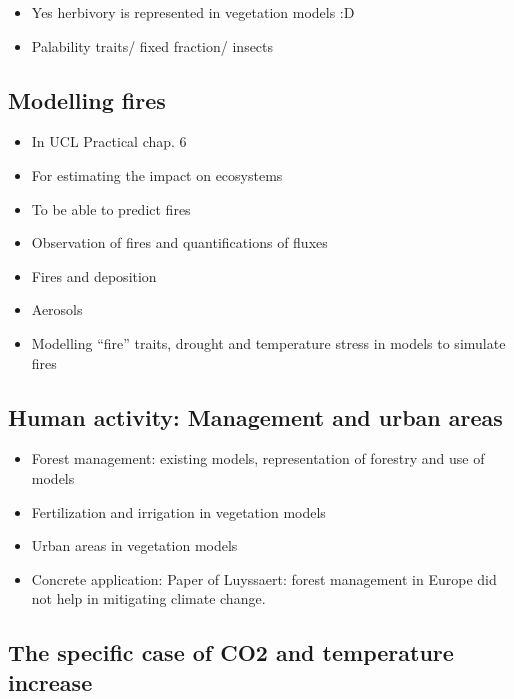 \documentclass[oneside]{book}
\providecommand{\tightlist}{%
  \setlength{\itemsep}{0pt}\setlength{\parskip}{0pt}}
\begin{document}
\begin{itemize}
\tightlist
\item
  Yes herbivory is represented in vegetation models :D
\item
  Palability traits/ fixed fraction/ insects
\end{itemize}

\subsection{Modelling fires}\label{modelling-fires}

\begin{itemize}
\tightlist
\item
  In UCL Practical chap. 6
\item
  For estimating the impact on ecosystems
\item
  To be able to predict fires
\item
  Observation of fires and quantifications of fluxes
\item
  Fires and deposition
\item
  Aerosols
\item
  Modelling ``fire'' traits, drought and temperature stress in models to
  simulate fires
\end{itemize}

\subsection{Human activity: Management and urban
areas}\label{human-activity-management-and-urban-areas}

\begin{itemize}
\tightlist
\item
  Forest management: existing models, representation of forestry and use
  of models
\item
  Fertilization and irrigation in vegetation models
\item
  Urban areas in vegetation models
\item
  Concrete application: Paper of Luyssaert: forest management in Europe
  did not help in mitigating climate change.
\end{itemize}

\subsection{The specific case of CO2 and temperature
increase}\label{the-specific-case-of-co2-and-temperature-increase}
\end{document}
